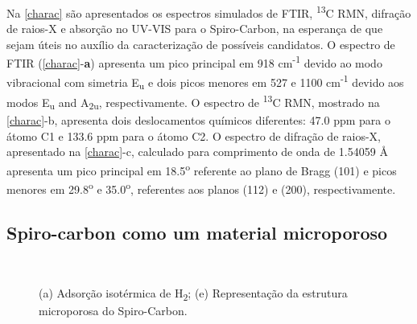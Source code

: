 	Na \autoref{charac} são apresentados os espectros simulados de FTIR, \textsuperscript{13}C RMN, difração de raios-X e absorção no UV-VIS para o Spiro-Carbon, na esperança de que sejam úteis no auxílio da caracterização de possíveis candidatos. O espectro de FTIR (\autoref{charac}-\textbf{a}) apresenta um pico principal em 918 cm\textsuperscript{-1} devido ao modo vibracional com simetria E\textsubscript{u} e dois picos menores em 527 e 1100 cm\textsuperscript{-1} devido aos modos  E\textsubscript{u} and A\textsubscript{2u}, respectivamente. O espectro de \textsuperscript{13}C RMN, mostrado na \autoref{charac}-b, apresenta dois deslocamentos químicos diferentes: 47.0 ppm para o átomo C1 e 133.6 ppm para o átomo C2. O espectro de difração de raios-X, apresentado na \autoref{charac}-c, calculado para comprimento de onda de 1.54059 Å apresenta um pico principal em 18.5\textsuperscript{o} referente ao plano de Bragg (101) e picos menores em 29.8\textsuperscript{o} e 35.0\textsuperscript{o}, referentes aos planos (112) e (200), respectivamente.
	
	\subsection{Spiro-carbon como um material microporoso}
	
	\begin{figure}[ht]
		\centering
		\\
		\caption{(a) Adsorção isotérmica de H\textsubscript{2}; (e) Representação da estrutura microporosa do Spiro-Carbon.}
		\label{charac_poros}
	\end{figure}

